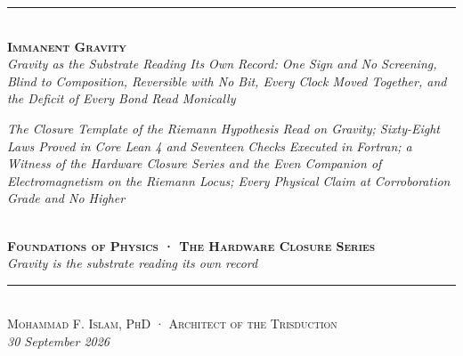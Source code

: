 \documentclass[10pt]{article}
\begin{document}
\begin{center}
{\color{accent}\rule{0.6\textwidth}{0.8pt}}\\[10pt]
{\bfseries\scshape\fontsize{19}{23}\selectfont Immanent Gravity}\\[7pt]
{\itshape\large Gravity as the Substrate Reading Its Own Record: One
Sign and No Screening, Blind to Composition, Reversible with No Bit,
Every Clock Moved Together, and the Deficit of Every Bond Read
Monically}\\[6pt]
\parbox{0.86\textwidth}{\centering\small\itshape\color{faint} The
Closure Template of the Riemann Hypothesis Read on Gravity; Sixty-Eight
Laws Proved in Core Lean 4 and Seventeen Checks Executed in Fortran; a
Witness of the Hardware Closure Series and the Even Companion of
Electromagnetism on the Riemann Locus; Every Physical Claim at
Corroboration Grade and No Higher}\\[8pt]
{\footnotesize\color{accent}\scshape\bfseries Foundations of Physics ·
The Hardware Closure Series}\\[3pt]
{\itshape\color{deep}\small Gravity is the substrate reading its own
record}\\[9pt]
{\color{accent}\rule{0.6\textwidth}{0.8pt}}\\[10pt]
{\scshape Mohammad F. Islam, PhD · Architect of the Trisduction}\\[2pt]

{\itshape\color{faint}\small 30 September 2026}\\[12pt]
\end{center}
\noindent{\color{accent}\rule{\textwidth}{0.6pt}}\\[2pt]
\end{document}
